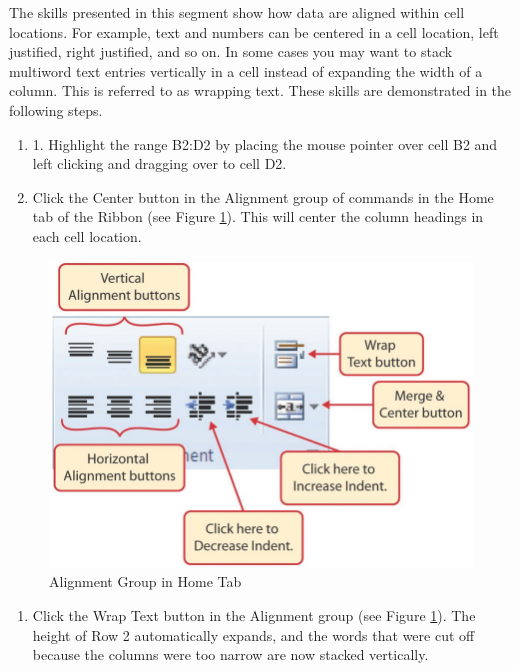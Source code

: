 The skills presented in this segment show how data are aligned within cell locations. For example, text and numbers can be centered in a cell location, left justified, right justified, and so on. In some cases you may want to stack multiword text entries vertically in a cell instead of expanding the width of a column. This is referred to as wrapping text. These skills are demonstrated in the following steps.

\begin{enumerate}
	\item 1. Highlight the range \textsf{B2:D2} by placing the mouse pointer over cell B2 and left clicking and dragging over to cell \textsf{D2}.
	\item Click the Center button in the Alignment group of commands in the Home tab of the Ribbon (see Figure \ref{01:fig38}). This will center the column headings in each cell location.
\end{enumerate}

\begin{figure}[H]
	\centering
	\includegraphics[width=\maxwidth{.95\linewidth}]{gfx/ch01_fig38}
	\caption{Alignment Group in Home Tab}
	\label{01:fig38}
\end{figure}

\begin{enumerate}[resume]
	\item Click the Wrap Text button in the Alignment group (see Figure \ref{01:fig38}). The height of Row 2 automatically expands, and the words that were cut off because the columns were too narrow are now stacked vertically.
\end{enumerate}

